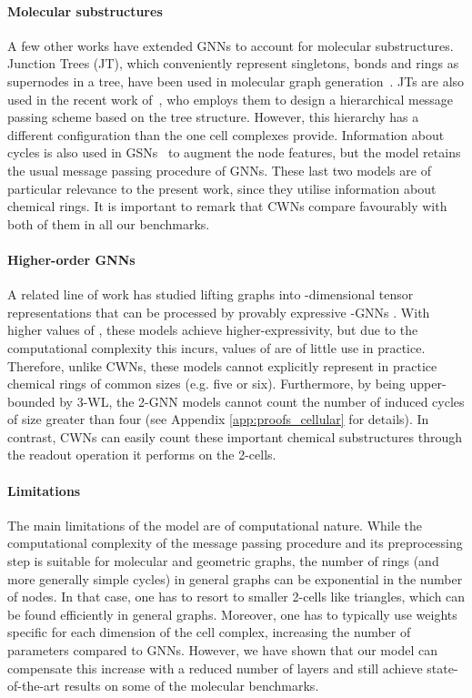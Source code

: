 \documentclass{article}
\begin{document}
\paragraph{Molecular substructures} A few other works have extended GNNs to account for molecular substructures. Junction Trees (JT), which conveniently represent singletons, bonds and rings as supernodes in a tree, have been used in molecular graph generation~\citep{jin2018junction, jin2019learning}. JTs are also used in the recent work of~\citet{Fey2020_himp}, who employs them to design a hierarchical message passing scheme based on the tree structure. However, this hierarchy has a different configuration than the one cell complexes provide. Information about cycles is also used in GSNs~\citep{bouritsas2020improving} to augment the node features, but the model retains the usual message passing procedure of GNNs. These last two models are of particular relevance to the present work, since they utilise information about chemical rings. It is important to remark that CWNs compare favourably with both of them in all our benchmarks. 

\paragraph{Higher-order GNNs} A related line of work has studied lifting graphs into -dimensional tensor representations that can be processed by provably expressive -GNNs \citep{maron2018invariant, maron2019provably, azizian2021expressive}. With higher values of , these models achieve higher-expressivity, but due to the computational complexity this incurs, values of  are of little use in practice. Therefore, unlike CWNs, these models cannot explicitly represent in practice chemical rings of common sizes (e.g. five or six). Furthermore, by being upper-bounded by 3-WL, the 2-GNN models cannot count the number of induced cycles of size greater than four (see Appendix \ref{app:proofs_cellular} for details). In contrast, CWNs can easily count these important chemical substructures through the readout operation it performs on the 2-cells. 

\paragraph{Limitations} 
The main limitations of the model are of computational nature. While the computational complexity of the message passing procedure and its preprocessing step is suitable for molecular and geometric graphs, the number of rings (and more generally simple cycles) in general graphs can be exponential in the number of nodes. In that case, one has to resort to smaller 2-cells like triangles, which can be found efficiently in general graphs. Moreover, one has to typically use weights specific for each dimension of the cell complex, increasing the number of parameters compared to GNNs. However, we have shown that our model can compensate this increase with a reduced number of layers and still achieve state-of-the-art results on some of the molecular benchmarks. 
\end{document}
